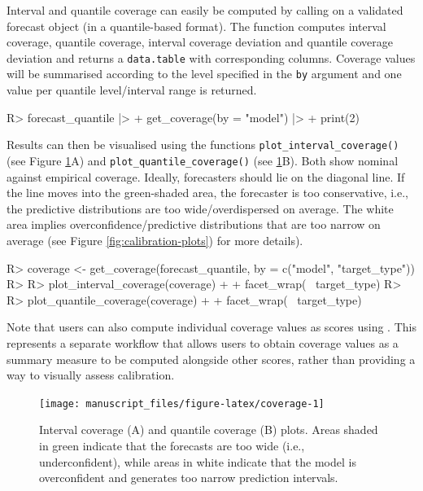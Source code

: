 \documentclass[
]{jss}
\begin{document}
Interval and quantile coverage can easily be computed by calling
 on a validated forecast object (in a
quantile-based format). The function computes interval coverage,
quantile coverage, interval coverage deviation and quantile coverage
deviation and returns a \texttt{data.table} with corresponding columns.
Coverage values will be summarised according to the level specified in
the \texttt{by} argument and one value per quantile level/interval range
is returned.

\begin{CodeChunk}
\begin{CodeInput}
R> forecast_quantile |>
+   get_coverage(by = "model") |>
+   print(2)
\end{CodeInput}
\end{CodeChunk}

Results can then be visualised using the functions
\texttt{plot\_interval\_coverage()} (see Figure \ref{fig:coverage}A) and
\texttt{plot\_quantile\_coverage()} (see \ref{fig:coverage}B). Both show
nominal against empirical coverage. Ideally, forecasters should lie on
the diagonal line. If the line moves into the green-shaded area, the
forecaster is too conservative, i.e., the predictive distributions are
too wide/overdispersed on average. The white area implies
overconfidence/predictive distributions that are too narrow on average
(see Figure \ref{fig:calibration-plots}) for more details).

\begin{CodeChunk}
\begin{CodeInput}
R> coverage <- get_coverage(forecast_quantile, by = c("model", "target_type")) 
R> 
R> plot_interval_coverage(coverage) + 
+   facet_wrap(~ target_type)
R> 
R> plot_quantile_coverage(coverage) + 
+   facet_wrap(~ target_type)
\end{CodeInput}
\end{CodeChunk}

Note that users can also compute individual coverage values as scores
using . This represents a separate workflow that allows
users to obtain coverage values as a summary measure to be computed
alongside other scores, rather than providing a way to visually assess
calibration.

\begin{CodeChunk}
\begin{figure}[!h]

{\centering \texttt{[image: manuscript\_files/figure-latex/coverage-1]} 

}

\caption[Interval coverage (A) and quantile coverage (B) plots]{Interval coverage (A) and quantile coverage (B) plots. Areas shaded in green indicate that the forecasts are too wide (i.e., underconfident), while areas in white indicate that the model is overconfident and generates too narrow prediction intervals.}\label{fig:coverage}
\end{figure}
\end{CodeChunk}
\end{document}
